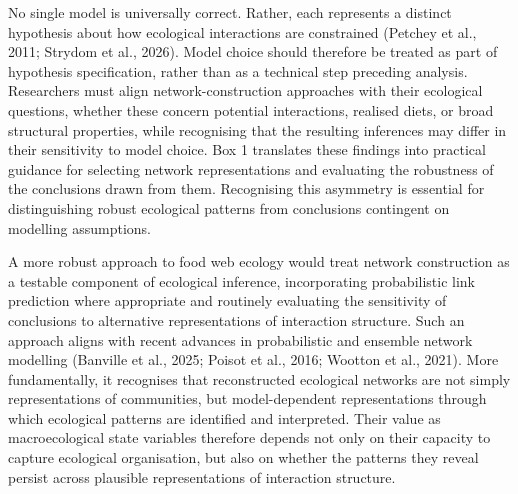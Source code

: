 \documentclass[
]{article}
\begin{document}
No single model is universally correct. Rather, each represents a
distinct hypothesis about how ecological interactions are constrained
(Petchey et al., 2011; Strydom et al., 2026). Model choice should
therefore be treated as part of hypothesis specification, rather than as
a technical step preceding analysis. Researchers must align
network-construction approaches with their ecological questions, whether
these concern potential interactions, realised diets, or broad
structural properties, while recognising that the resulting inferences
may differ in their sensitivity to model choice. Box 1 translates these
findings into practical guidance for selecting network representations
and evaluating the robustness of the conclusions drawn from them.
Recognising this asymmetry is essential for distinguishing robust
ecological patterns from conclusions contingent on modelling
assumptions.

A more robust approach to food web ecology would treat network
construction as a testable component of ecological inference,
incorporating probabilistic link prediction where appropriate and
routinely evaluating the sensitivity of conclusions to alternative
representations of interaction structure. Such an approach aligns with
recent advances in probabilistic and ensemble network modelling
(Banville et al., 2025; Poisot et al., 2016; Wootton et al., 2021). More
fundamentally, it recognises that reconstructed ecological networks are
not simply representations of communities, but model-dependent
representations through which ecological patterns are identified and
interpreted. Their value as macroecological state variables therefore
depends not only on their capacity to capture ecological organisation,
but also on whether the patterns they reveal persist across plausible
representations of interaction structure.
\end{document}
